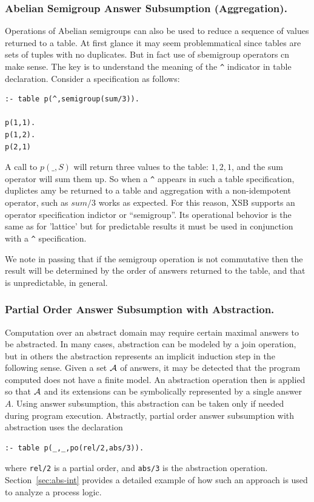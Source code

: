 \subsubsection{Abelian Semigroup Answer Subsumption (Aggregation).}

Operations of Abelian semigroups can also be used to reduce a sequence
of values returned to a table.  At first glance it may seem
problemmatical since tables are sets of tuples with no duplicates.
But in fact use of sbemigroup operators cn make sense.  The key is to
understand the meaning of the \verb|^| indicator in table
declaration.  Consider a specification as follows:
\begin{verbatim}
:- table p(^,semigroup(sum/3)).

p(1,1).
p(1,2).
p(2,1)
\end{verbatim}
A call to $p(\_,S)$ will return three values to the table: $1, 2, 1$,
and the sum operator will sum them up.  So when a \verb|^| appears in
such a table specification, duplictes amy be returned to a table and
aggregation with a non-idempotent operator, such as $sum/3$ works as
expected.  For this reason, XSB supports an operator specification
indictor or ``semigroup''.  Its operational behovior is the same as
for 'lattice' but for predictable results it must be used in
conjunction with a \verb|^| specification.

We note in passing that if the semigroup operation is not commutative
then the result will be determined by the order of answers returned to
the table, and that is unpredictable, in general.

\subsubsection{Partial Order Answer Subsumption with Abstraction.}
Computation over an abstract domain may require certain maximal
answers to be abstracted.  In many cases, abstraction can be modeled
by a join operation, but in others the abstraction represents an
implicit induction step in the following sense. Given a set ${\cal A}$ of
answers, it may be detected that the program computed does not have a
finite model.  An abstraction operation then is applied so that ${\cal A}$
and its extensions can be symbolically represented by a single answer
$A$.  Using answer subsumption, this abstraction can be taken only if
needed during program execution.  Abstractly, partial order answer
subsumption with abstraction uses the declaration {\small
\begin{verbatim}
:- table p(_,_,po(rel/2,abs/3)).
\end{verbatim}
} 
%
\noindent
where {\tt rel/2} is a partial order, and {\tt abs/3} is the
abstraction operation.  Section~\ref{sec:abs-int} provides a detailed
example of how such an approach is used to analyze a process logic.

